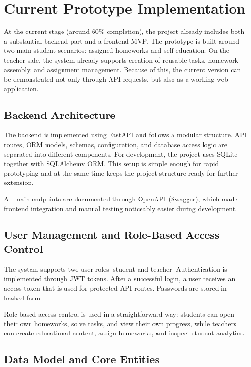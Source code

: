 \documentclass[a4paper,12pt]{extarticle}
\begin{document}
\section{Current Prototype Implementation}

At the current stage (around 60\% completion), the project already includes both a substantial backend part and a frontend MVP. The prototype is built around two main student scenarios: assigned homeworks and self-education. On the teacher side, the system already supports creation of reusable tasks, homework assembly, and assignment management. Because of this, the current version can be demonstrated not only through API requests, but also as a working web application.

\subsection{Backend Architecture}

The backend is implemented using FastAPI and follows a modular structure. API routes, ORM models, schemas, configuration, and database access logic are separated into different components. For development, the project uses SQLite together with SQLAlchemy ORM. This setup is simple enough for rapid prototyping and at the same time keeps the project structure ready for further extension.

All main endpoints are documented through OpenAPI (Swagger), which made frontend integration and manual testing noticeably easier during development.

\subsection{User Management and Role-Based Access Control}

The system supports two user roles: student and teacher. Authentication is implemented through JWT tokens. After a successful login, a user receives an access token that is used for protected API routes. Passwords are stored in hashed form.

Role-based access control is used in a straightforward way: students can open their own homeworks, solve tasks, and view their own progress, while teachers can create educational content, assign homeworks, and inspect student analytics.

\subsection{Data Model and Core Entities}
\end{document}
